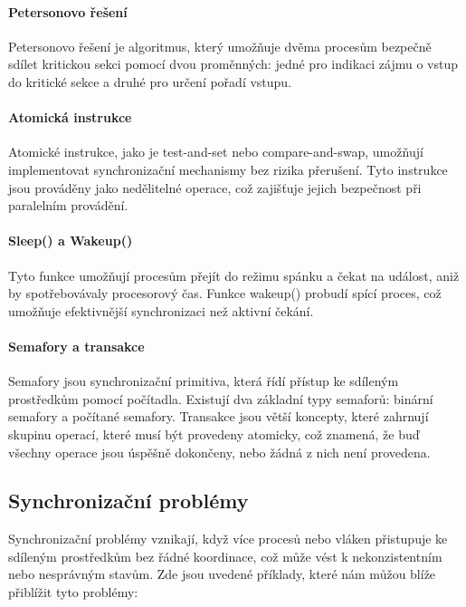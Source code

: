 \paragraph{Petersonovo řešení}

Petersonovo řešení je algoritmus, který umožňuje dvěma procesům bezpečně sdílet kritickou sekci pomocí dvou proměnných: jedné pro indikaci zájmu o vstup do kritické sekce a druhé pro určení pořadí vstupu.

\paragraph{Atomická instrukce}

Atomické instrukce, jako je test-and-set nebo compare-and-swap, umožňují implementovat synchronizační mechanismy bez rizika přerušení. Tyto instrukce jsou prováděny jako nedělitelné operace, což zajišťuje jejich bezpečnost při paralelním provádění.

\paragraph{Sleep() a Wakeup()}

Tyto funkce umožňují procesům přejít do režimu spánku a čekat na událost, aniž by spotřebovávaly procesorový čas. Funkce wakeup() probudí spící proces, což umožňuje efektivnější synchronizaci než aktivní čekání.

\paragraph{Semafory a transakce}
Semafory jsou synchronizační primitiva, která řídí přístup ke sdíleným prostředkům pomocí počítadla. Existují dva základní typy semaforů: binární semafory a počítané semafory. Transakce jsou větší koncepty, které zahrnují skupinu operací, které musí být provedeny atomicky, což znamená, že buď všechny operace jsou úspěšně dokončeny, nebo žádná z nich není provedena.

\subsection{Synchronizační problémy}

Synchronizační problémy vznikají, když více procesů nebo vláken přistupuje ke sdíleným prostředkům bez řádné koordinace, což může vést k nekonzistentním nebo nesprávným stavům. Zde jsou uvedené příklady, které nám můžou blíže přiblížit tyto problémy: 

